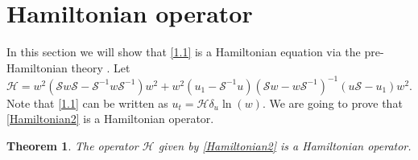 \documentclass{article}
\numberwithin{equation}{section}
\newtheorem{theorem}{Theorem}[section]
\begin{document}
\section{Hamiltonian operator}\label{Sec2bis}
	In this section we will show that \eqref{1.1} is a Hamiltonian equation
	via the pre-Hamiltonian theory \cite{4,42}. Let
	\begin{equation}
		\mathcal{H} = w^2 \left(\mathcal{S} w \mathcal{S} - \mathcal{S}^{-1}w
\mathcal{S}^{-1} \right) w^2+ w^2\left(u_1-\mathcal{S}^{-1} u\right) 
\left(\mathcal{S} w - w \mathcal{S}^{-1}\right)^{-1} (u \mathcal{S}-u_1) w^2 .
		\label{Hamiltonian2}
	\end{equation}
Note that \eqref{1.1} can be written as $u_t=\mathcal{H} \delta_u \ln(w) $.
We are going to prove that \eqref{Hamiltonian2} is a
Hamiltonian operator.
	\begin{theorem}\label{theo4}
		The operator $\mathcal{H}$ given by \eqref{Hamiltonian2} is
a Hamiltonian operator.
	\end{theorem}
\end{document}
